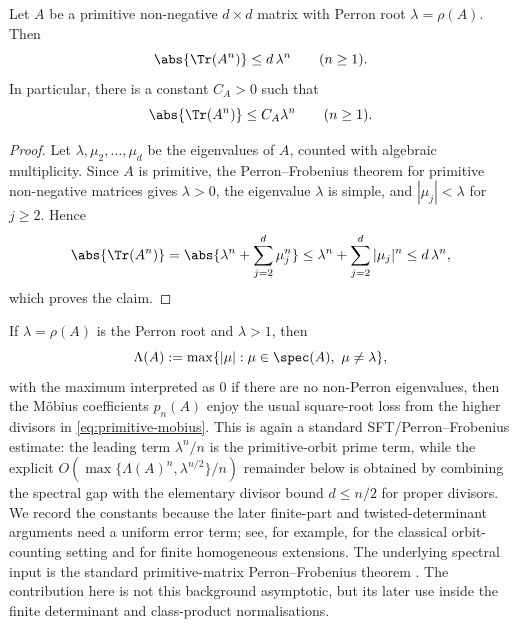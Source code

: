 \begin{lemma}
  \label{lem:pf-trace-bound}
  Let \(A\) be a primitive non-negative \(d\times d\) matrix with
  Perron root \(\lambda=\rho(A)\). Then
  \[
    \abs{\Tr(A^n)}\le d\,\lambda^n
    \qquad (n\ge 1).
  \]
  In particular, there is a constant \(C_A>0\) such that
  \[
    \abs{\Tr(A^n)}\le C_A\lambda^n
    \qquad (n\ge 1).
  \]
\end{lemma}

\begin{proof}
  Let \(\lambda,\mu_2,\dots,\mu_d\) be the eigenvalues of \(A\), counted
  with algebraic multiplicity. Since \(A\) is primitive,
  the Perron--Frobenius theorem for primitive non-negative matrices
  \cite{Seneta2006NonnegativeMatrices} gives \(\lambda>0\), the eigenvalue
  \(\lambda\) is simple, and \(|\mu_j|<\lambda\) for \(j\ge 2\). Hence
  \[
    \abs{\Tr(A^n)}
    =
    \abs{\lambda^n+\sum_{j=2}^d\mu_j^n}
    \le
    \lambda^n+\sum_{j=2}^d|\mu_j|^n
    \le
    d\,\lambda^n,
  \]
  which proves the claim.
\end{proof}

If \(\lambda=\rho(A)\) is the Perron root and \(\lambda>1\), then
\[
  \Lambda(A):=\max\{|\mu|:\mu\in\spec(A),\ \mu\neq\lambda\},
\]
with the maximum interpreted as \(0\) if there are no non-Perron
eigenvalues,
then the M\"obius coefficients \(p_n(A)\) enjoy the usual square-root
loss from the higher divisors in \eqref{eq:primitive-mobius}.  This is
again a standard SFT/Perron--Frobenius estimate: the leading term
\(\lambda^n/n\) is the primitive-orbit prime term, while the explicit
\(O(\max\{\Lambda(A)^n,\lambda^{n/2}\}/n)\) remainder below is obtained by
combining the spectral gap with the elementary divisor bound
\(d\le n/2\) for proper divisors.  We record the constants because the
later finite-part and twisted-determinant arguments need a uniform error
term; see, for example,
\cite{Parry1983PrimeOrbit,LindMarcus1995,ParryPollicott1990Zeta} for the
classical orbit-counting setting and
\cite{NooraniParry1992ChebotarevShifts} for finite homogeneous extensions.
The underlying spectral input is the standard primitive-matrix
Perron--Frobenius theorem \cite{Seneta2006NonnegativeMatrices}.  The
contribution here is not this
background asymptotic, but its later use inside the finite determinant and
class-product normalisations.

